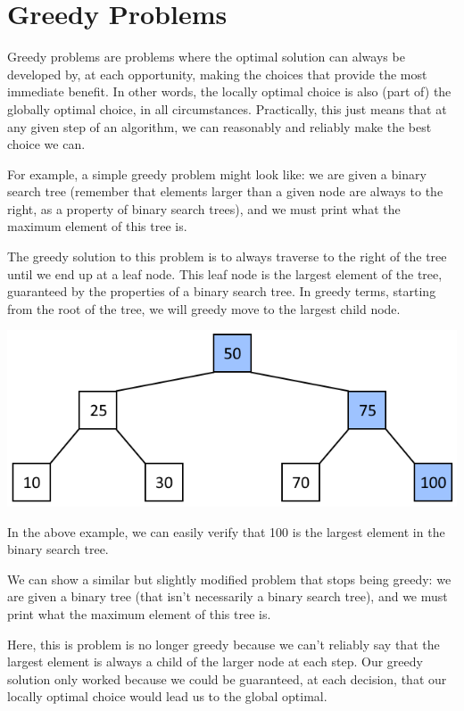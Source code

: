 \section{Greedy Problems}

Greedy problems are problems where the optimal solution can always be developed by, at each opportunity, making the choices that provide the most immediate benefit. In other words, the locally optimal choice is also (part of) the globally optimal choice, in all circumstances. Practically, this just means that at any given step of an algorithm, we can reasonably and reliably make the best choice we can.

For example, a simple greedy problem might look like: we are given a binary search tree (remember that elements larger than a given node are always to the right, as a property of binary search trees), and we must print what the maximum element of this tree is.

The greedy solution to this problem is to always traverse to the right of the tree until we end up at a leaf node. This leaf node is the largest element of the tree, guaranteed by the properties of a binary search tree. In greedy terms, starting from the root of the tree, we will greedy move to the largest child node.

{\centering \includegraphics{images/greedy/greedy_tree_1.png}}

In the above example, we can easily verify that 100 is the largest element in the binary search tree.

We can show a similar but slightly modified problem that stops being greedy: we are given a binary tree (that isn't necessarily a binary search tree), and we must print what the maximum element of this tree is.

Here, this is problem is no longer greedy because we can't reliably say that the largest element is always a child of the larger node at each step. Our greedy solution only worked because we could be guaranteed, at each decision, that our locally optimal choice would lead us to the global optimal.


